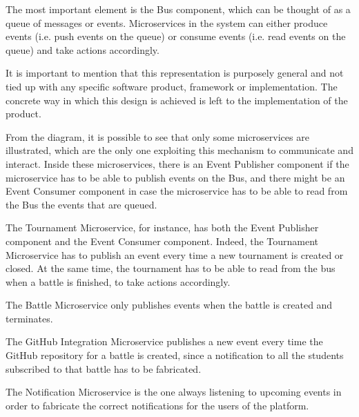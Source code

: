 The most important element is the Bus component, which can be thought of as a queue of messages or events. Microservices in the \app system can either produce events (i.e. push events on the queue) or consume events (i.e. read events on the queue) and take actions accordingly.

It is important to mention that this representation is purposely general and not tied up with any specific software product, framework or implementation. The concrete way in which this design is achieved is left to the implementation of the product.

From the diagram, it is possible to see that only some microservices are illustrated, which are the only one exploiting this mechanism to communicate and interact. 
Inside these microservices, there is an Event Publisher component if the microservice has to be able to publish events on the Bus, and there might be an Event Consumer component in case the microservice has to be able to read from the Bus the events that are queued.

The Tournament Microservice, for instance, has both the Event Publisher component and the Event Consumer component. Indeed, the Tournament Microservice has to publish an event every time a new tournament is created or closed. At the same time, the tournament has to be able to read from the bus when a battle is finished, to take actions accordingly. 

The Battle Microservice only publishes events when the battle is created and terminates.

The GitHub Integration Microservice publishes a new event every time the GitHub repository for a battle is created, since a notification to all the students subscribed to that battle has to be fabricated.

The Notification Microservice is the one always listening to upcoming events in order to fabricate the correct notifications for the users of the \app platform.




